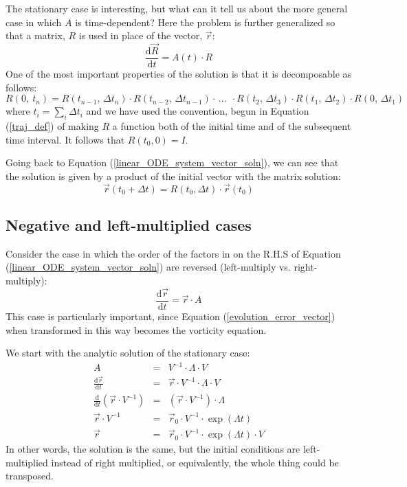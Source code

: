 \documentclass[12pt]{article}
\begin{document}
The stationary case is interesting, but what can it tell us about the 
more general case in which $A$ is time-dependent?
Here the problem is further generalized so that a matrix, $R$ 
is used in place of the vector, $\vec r$:
\begin{equation}
\frac{\mathrm d \vec R}{\mathrm d t}=A(t) \cdot R
\label{linear_ODE_system_matrix_soln}
\end{equation}
One of the most important properties of the solution is that it
is decomposable as follows:
\begin{equation}
R(0,~t_n) = R(t_{n-1},\,\Delta t_n) \cdot R(t_{n-2},\,\Delta t_{n-1}) \cdot \, ...~~ \cdot R(t_2,\, \Delta t_3) \cdot R(t_1,\,\Delta t_2) \cdot R(0,\,\Delta t_1)
\label{matrix_soln_decomposition}
\end{equation}
where $t_i=\sum_i \Delta t_i$ and we have used the convention, begun
in Equation (\ref{traj_def}) of making $R$ a function both of the
initial time and of the subsequent time interval.  It follows that $R(t_0, 0)=I$.

Going back to Equation (\ref{linear_ODE_system_vector_soln}), we can
see that the solution is given by a product of the initial vector with
the matrix solution:
\begin{equation}
\vec r(t_0+\Delta t)=R(t_0, \Delta t) \cdot \vec r(t_0)
\end{equation}

\subsection{Negative and left-multiplied cases}

Consider the case in which the order of the factors in on the R.H.S of Equation 
(\ref{linear_ODE_system_vector_soln}) are reversed (left-multiply vs. right-multiply):
\begin{equation}
\frac{\mathrm d \vec r}{\mathrm d t} = \vec r \cdot A
\end{equation}
This case is particularly important, since Equation (\ref{evolution_error_vector})
when transformed in this way becomes the vorticity equation.

We start with the analytic solution of the stationary case:
\begin{eqnarray}
A & = & V^{-1} \cdot \Lambda \cdot V \\
\frac{\mathrm d \vec r}{\mathrm d t} & = & \vec r \cdot V^{-1} \cdot \Lambda \cdot V \\
\frac{\mathrm d}{\mathrm d t} (\vec r \cdot V^{-1}) & = & (\vec r \cdot V^{-1}) \cdot \Lambda \\
\vec r \cdot V^{-1} & = & \vec r_0 \cdot V^{-1} \cdot \exp (\Lambda t) \\
\vec r & = & \vec r_0 \cdot V^{-1} \cdot \exp (\Lambda t) \cdot V 
\end{eqnarray}
In other words, the solution is the same, but the initial conditions are
left-multiplied instead of right multiplied, or equivalently, the whole thing 
could be transposed.
\end{document}
